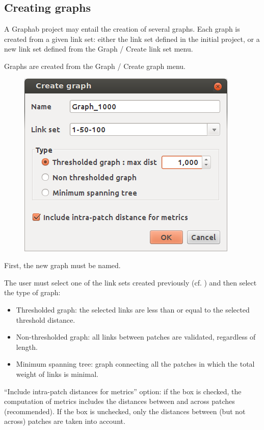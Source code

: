 \documentclass{article}
\begin{document}
\subsection{Creating graphs}

A Graphab project may entail the creation of several graphs. Each graph is created from a given link set: either the link set defined in the initial project, or a new link set defined from the Graph / Create link set menu.

Graphs are created from the Graph / Create graph menu. 

\begin{figure}[H]
	\includegraphics[scale=0.5]{img/manual-en_img6.png}
\end{figure}
	
First, the new graph must be named.

The user must select one of the link sets created previously (cf. ) and then select the type of graph:
\begin{itemize}
	\item Thresholded graph: the selected links are less than or equal to the selected threshold distance.
	\item Non-thresholded graph: all links between patches are validated, regardless of length.
	\item Minimum spanning tree: graph connecting all the patches in which the total weight of links is minimal.
\end{itemize}

“Include intra-patch distances for metrics” option: if the box is checked, the computation of metrics includes the distances between and across patches (recommended). If the box is unchecked, only the distances between (but not across) patches are taken into account.
\end{document}
